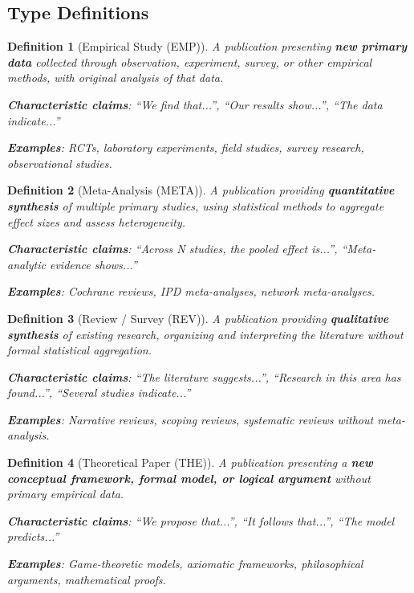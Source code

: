 \documentclass[11pt,a4paper]{article}
\newtheorem{definition}{Definition}[section]
\begin{document}
\subsection{Type Definitions}

\begin{definition}[Empirical Study (EMP)]
\label{def:emp}
A publication presenting \textbf{new primary data} collected through observation, experiment, survey, or other empirical methods, with original analysis of that data.

\textbf{Characteristic claims}: ``We find that...'', ``Our results show...'', ``The data indicate...''

\textbf{Examples}: RCTs, laboratory experiments, field studies, survey research, observational studies.
\end{definition}

\begin{definition}[Meta-Analysis (META)]
\label{def:meta}
A publication providing \textbf{quantitative synthesis} of multiple primary studies, using statistical methods to aggregate effect sizes and assess heterogeneity.

\textbf{Characteristic claims}: ``Across N studies, the pooled effect is...'', ``Meta-analytic evidence shows...''

\textbf{Examples}: Cochrane reviews, IPD meta-analyses, network meta-analyses.
\end{definition}

\begin{definition}[Review / Survey (REV)]
\label{def:rev}
A publication providing \textbf{qualitative synthesis} of existing research, organizing and interpreting the literature without formal statistical aggregation.

\textbf{Characteristic claims}: ``The literature suggests...'', ``Research in this area has found...'', ``Several studies indicate...''

\textbf{Examples}: Narrative reviews, scoping reviews, systematic reviews without meta-analysis.
\end{definition}

\begin{definition}[Theoretical Paper (THE)]
\label{def:the}
A publication presenting a \textbf{new conceptual framework, formal model, or logical argument} without primary empirical data.

\textbf{Characteristic claims}: ``We propose that...'', ``It follows that...'', ``The model predicts...''

\textbf{Examples}: Game-theoretic models, axiomatic frameworks, philosophical arguments, mathematical proofs.
\end{definition}
\end{document}
